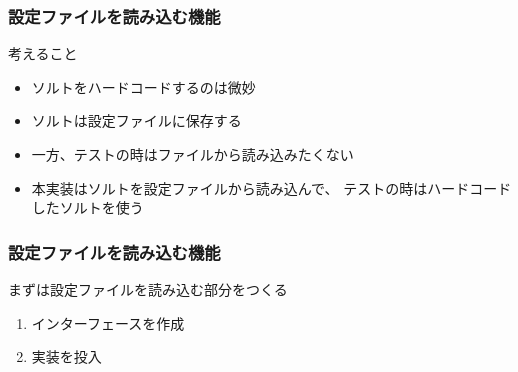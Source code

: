 \begin{frame}
  \frametitle{設定ファイルを読み込む機能}

  \begin{block}{考えること}
    \begin{itemize}
      \item<2-> ソルトをハードコードするのは微妙
      \item<3-> ソルトは設定ファイルに保存する
      \item<4-> 一方、テストの時はファイルから読み込みたくない
        \begin{center}
        \end{center}
      \item<6-> 本実装はソルトを設定ファイルから読み込んで、
        テストの時はハードコードしたソルトを使う
        \begin{center}
        \end{center}
    \end{itemize}
  \end{block}
\end{frame}

\begin{frame}
  \frametitle{設定ファイルを読み込む機能}

  まずは設定ファイルを読み込む部分をつくる
  \begin{enumerate}
    \item<2-> インターフェースを作成
      
    \item<3-> 実装を投入
      
  \end{enumerate}
\end{frame}


